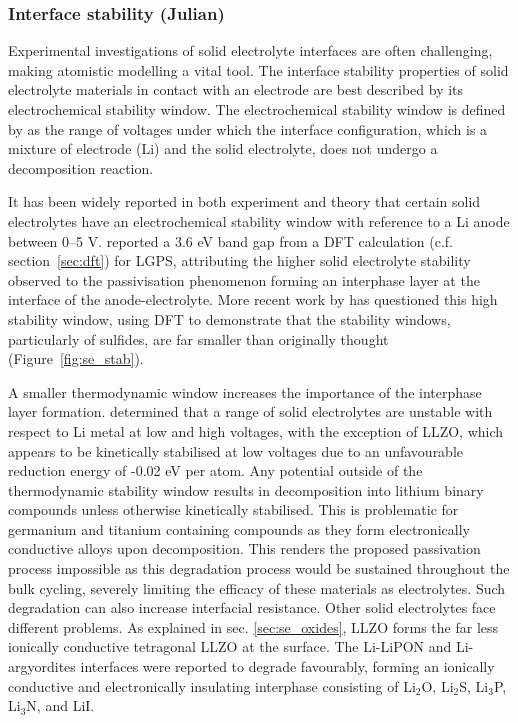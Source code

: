 \documentclass[../main.tex]{subfiles}
\begin{document}
\subsubsection{Interface stability (Julian)}
\label{sec:interface_stability}
Experimental investigations of solid electrolyte interfaces are often challenging, making atomistic modelling a vital tool.\cite{Xu2018exp} The interface stability properties of solid electrolyte materials in contact with an electrode are best described by its electrochemical stability window. The electrochemical stability window is defined by \citeauthor{Zhu2016} as the range of voltages under which the interface configuration, which is a mixture of electrode (Li) and the solid electrolyte, does not undergo a decomposition reaction.\cite{Zhu2016}

It has been widely reported in both experiment\cite{Liu2013, Han2015} and theory\cite{Mo2012} that certain solid electrolytes have an electrochemical stability window with reference to a Li anode between 0--5 V.\cite{Kamaya2011, Thangadurai2005, Liu2013} \citeauthor{Mo2012} reported a 3.6 eV band gap from a DFT calculation (c.f. section~\ref{sec:dft}) for LGPS,\cite{Mo2012} attributing the higher solid electrolyte stability observed to the passivisation phenomenon forming an interphase layer at the interface of the anode-electrolyte.\cite{Kobayashi2008} More recent work by \citeauthor{Zhu2015} has questioned this high stability window, using DFT to demonstrate that the stability windows, particularly of sulfides, are far smaller than originally thought (Figure~\ref{fig:se_stab}).\cite{Zhu2015} 

A smaller thermodynamic window increases the importance of the interphase layer formation. \citeauthor{Zhu2015} determined that a range of solid electrolytes are unstable with respect to Li metal at low and high voltages, with the exception of LLZO, which appears to be kinetically stabilised at low voltages due to an unfavourable reduction energy of -0.02 eV per atom. Any potential outside of the thermodynamic stability window results in decomposition into lithium binary compounds unless otherwise kinetically stabilised. This is problematic for germanium and titanium containing compounds as they form electronically conductive alloys upon decomposition.\cite{Zhu2015} This renders the proposed passivation process impossible\cite{Mo2012, Zhu2015} as this degradation process would be sustained throughout the bulk cycling, severely limiting the efficacy of these materials as electrolytes. Such degradation can also increase interfacial resistance\cite{Takada2008, Sakuda2010}. Other solid electrolytes face different problems. As explained in sec. \ref{sec:se_oxides}, LLZO forms the far less ionically conductive tetragonal LLZO at the surface. The Li-LiPON and Li-argyordites interfaces were reported to degrade favourably, forming an ionically conductive and electronically insulating interphase consisting of Li$_2$O, Li$_2$S, Li$_3$P, Li$_3$N, and LiI.\cite{Zhu2015} 
\end{document}
